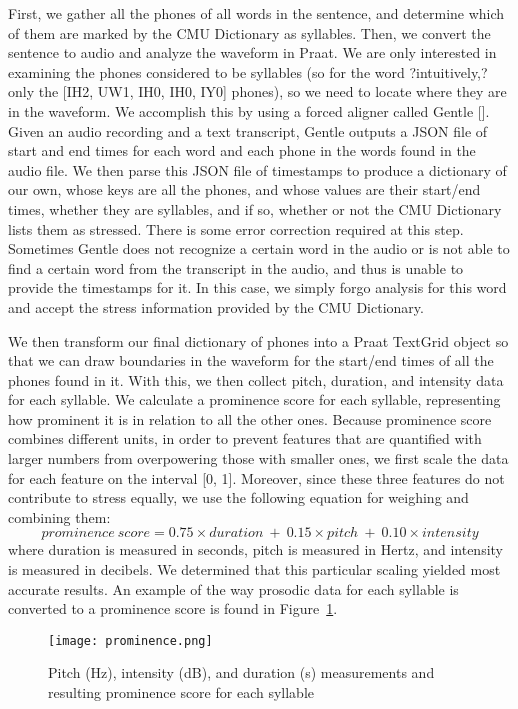 \documentclass[pageno]{jpaper}
\begin{document}
First, we gather all the phones of all words in the sentence, and determine which of them are marked by the CMU Dictionary as syllables. Then, we convert the sentence to audio and analyze the waveform in Praat. We are only interested in examining the phones considered to be syllables (so for the word ?intuitively,? only the [IH2, UW1, IH0, IH0, IY0] phones), so we need to locate where they are in the waveform. We accomplish this by using a forced aligner called Gentle []. Given an audio recording and a text transcript, Gentle outputs a JSON file of start and end times for each word and each phone in the words found in the audio file. We then parse this JSON file of timestamps to produce a dictionary of our own, whose keys are all the phones, and whose values are their start/end times, whether they are syllables, and if so, whether or not the CMU Dictionary lists them as stressed. There is some error correction required at this step. Sometimes Gentle does not recognize a certain word in the audio or is not able to find a certain word from the transcript in the audio, and thus is unable to provide the timestamps for it. In this case, we simply forgo analysis for this word and accept the stress information provided by the CMU Dictionary. 

We then transform our final dictionary of phones into a Praat TextGrid object so that we can draw boundaries in the waveform for the start/end times of all the phones found in it. With this, we then collect pitch, duration, and intensity data for each syllable. We calculate a prominence score for each syllable, representing how prominent it is in relation to all the other ones. Because prominence score combines different units, in order to prevent features that are quantified with larger numbers from overpowering those with smaller ones, we first scale the data for each feature on the interval [0, 1]. Moreover, since these three features do not contribute to stress equally, we use the following equation for weighing and combining them:
\[
prominence \ score =0.75 \times duration \ + \ 0.15 \times pitch \ + \ 0.10 \times intensity
\]
where duration is measured in seconds, pitch is measured in Hertz, and intensity is measured in decibels. We determined that this particular scaling yielded most accurate results. An example of the way prosodic data for each syllable is converted to a prominence score is found in Figure~\ref{fig:prominence}.

\begin{figure}[hbt]
\centering
\texttt{[image: prominence.png]}
\caption{Pitch (Hz), intensity (dB), and duration (s) measurements and resulting prominence score for each syllable}
\label{fig:prominence}
\end{figure}
\end{document}
